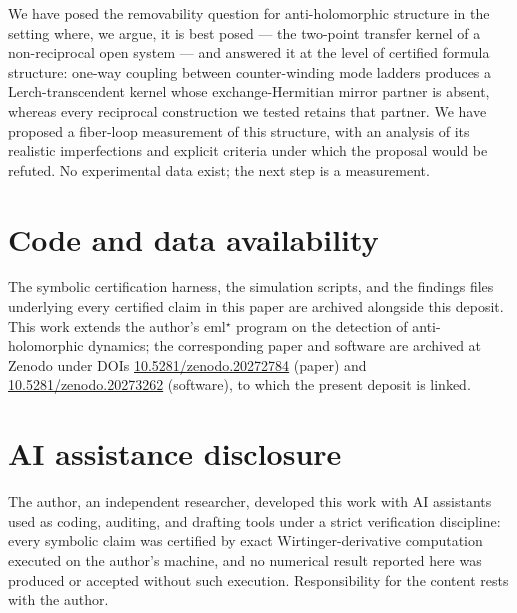 \documentclass[11pt,a4paper]{article}
\begin{document}
We have posed the removability question for anti-holomorphic structure in the
setting where, we argue, it is best posed --- the two-point transfer kernel of
a non-reciprocal open system --- and answered it at the level of certified
formula structure: one-way coupling between counter-winding mode ladders
produces a Lerch-transcendent kernel whose exchange-Hermitian mirror partner is
absent, whereas every reciprocal construction we tested retains that partner.
We have proposed a fiber-loop measurement of this structure, with an analysis
of its realistic imperfections and explicit criteria under which the proposal
would be refuted. No experimental data exist; the next step is a measurement.

\section*{Code and data availability}

The symbolic certification harness, the simulation scripts, and the findings
files underlying every certified claim in this paper are archived alongside
this deposit. This work extends the author's eml$^\star$ program on the
detection of anti-holomorphic dynamics; the corresponding paper and software
are archived at Zenodo under DOIs \href{https://doi.org/10.5281/zenodo.20272784}{10.5281/zenodo.20272784}
(paper) and \href{https://doi.org/10.5281/zenodo.20273262}{10.5281/zenodo.20273262}
(software), to which the present deposit is linked.

\section*{AI assistance disclosure}

The author, an independent researcher, developed this work with AI assistants
used as coding, auditing, and drafting tools under a strict verification
discipline: every symbolic claim was certified by exact Wirtinger-derivative
computation executed on the author's machine, and no numerical result reported
here was produced or accepted without such execution. Responsibility for the
content rests with the author.
\end{document}
